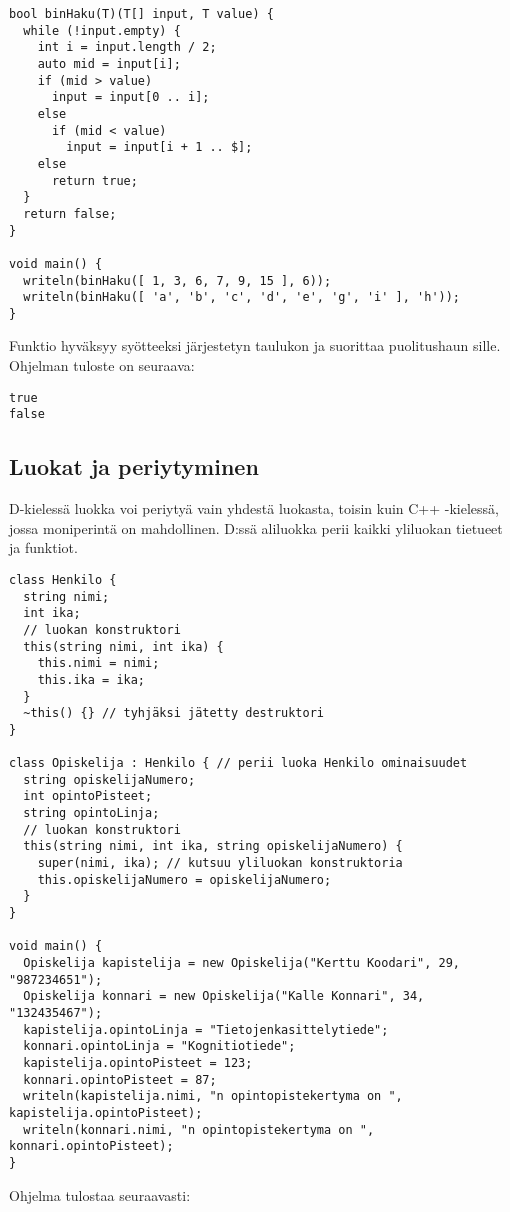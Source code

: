 \documentclass[11pt,oneside,a4paper]{article}
\begin{document}
\begin{verbatim}
bool binHaku(T)(T[] input, T value) {
  while (!input.empty) {
    int i = input.length / 2;
    auto mid = input[i];
    if (mid > value)
      input = input[0 .. i];
    else 
      if (mid < value)
        input = input[i + 1 .. $];
    else 
      return true;
  }
  return false;
}

void main() {
  writeln(binHaku([ 1, 3, 6, 7, 9, 15 ], 6));
  writeln(binHaku([ 'a', 'b', 'c', 'd', 'e', 'g', 'i' ], 'h'));
}
\end{verbatim}

Funktio hyväksyy syötteeksi järjestetyn taulukon ja suorittaa puolitushaun sille. Ohjelman tuloste on seuraava:
\begin{verbatim}
true
false
\end{verbatim}

\subsection{Luokat ja periytyminen}
D-kielessä luokka voi periytyä vain yhdestä luokasta, toisin kuin C++ -kielessä, jossa moniperintä on mahdollinen. D:ssä aliluokka perii kaikki yliluokan tietueet ja funktiot. 
\begin{verbatim}
class Henkilo {
  string nimi;
  int ika;
  // luokan konstruktori
  this(string nimi, int ika) {
    this.nimi = nimi;
    this.ika = ika;
  }
  ~this() {} // tyhjäksi jätetty destruktori
}

class Opiskelija : Henkilo { // perii luoka Henkilo ominaisuudet
  string opiskelijaNumero;
  int opintoPisteet;
  string opintoLinja;
  // luokan konstruktori
  this(string nimi, int ika, string opiskelijaNumero) { 
    super(nimi, ika); // kutsuu yliluokan konstruktoria
    this.opiskelijaNumero = opiskelijaNumero;
  }
}

void main() {
  Opiskelija kapistelija = new Opiskelija("Kerttu Koodari", 29, "987234651");
  Opiskelija konnari = new Opiskelija("Kalle Konnari", 34, "132435467");
  kapistelija.opintoLinja = "Tietojenkasittelytiede";
  konnari.opintoLinja = "Kognitiotiede";
  kapistelija.opintoPisteet = 123;
  konnari.opintoPisteet = 87;
  writeln(kapistelija.nimi, "n opintopistekertyma on ", kapistelija.opintoPisteet);
  writeln(konnari.nimi, "n opintopistekertyma on ", konnari.opintoPisteet);
}
\end{verbatim}
Ohjelma tulostaa seuraavasti:
\end{document}

